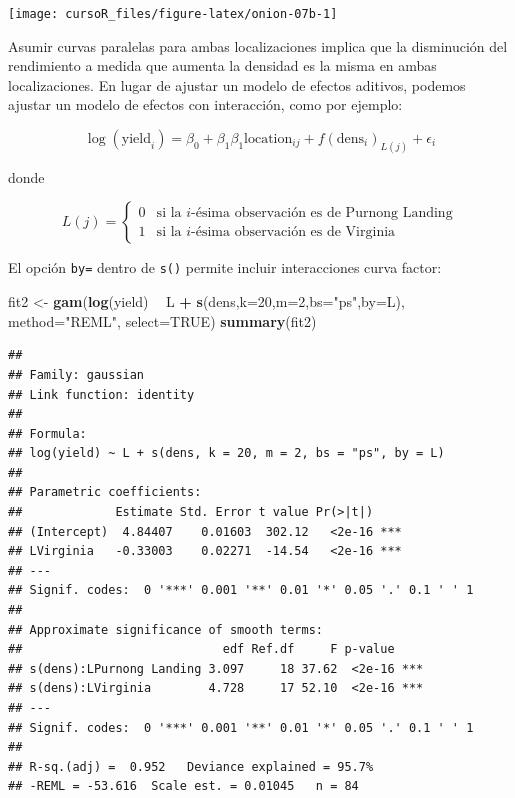 \documentclass[]{book}
\newenvironment{Shaded}{\begin{snugshade}}{\end{snugshade}}
\newcommand{\KeywordTok}[1]{\textcolor[rgb]{0.13,0.29,0.53}{\textbf{#1}}}
\newcommand{\DataTypeTok}[1]{\textcolor[rgb]{0.13,0.29,0.53}{#1}}
\newcommand{\DecValTok}[1]{\textcolor[rgb]{0.00,0.00,0.81}{#1}}
\newcommand{\StringTok}[1]{\textcolor[rgb]{0.31,0.60,0.02}{#1}}
\newcommand{\OtherTok}[1]{\textcolor[rgb]{0.56,0.35,0.01}{#1}}
\newcommand{\OperatorTok}[1]{\textcolor[rgb]{0.81,0.36,0.00}{\textbf{#1}}}
\newcommand{\NormalTok}[1]{#1}
\begin{document}
\begin{center}\texttt{[image: cursoR\_files/figure-latex/onion-07b-1]} \end{center}

Asumir curvas paralelas para ambas localizaciones implica que la
disminución del rendimiento a medida que aumenta la densidad es la misma
en ambas localizaciones. En lugar de ajustar un modelo de efectos
aditivos, podemos ajustar un modelo de efectos con interacción, como por
ejemplo:

\[
\log(\text{yield}_i) =\beta_0 + \beta_1 \beta_1\text{location}_{ij} +  f(\text{dens}_i)_{L(j)} + \epsilon_i
\]

donde

\[
L(j) =
\left\{
\begin{array}{cl}
0 & \mbox{si la $i$-ésima observación es de Purnong Landing} \\
1 & \mbox{si la $i$-ésima observación es de Virginia}
\end{array}
\right.
\]

El opción \texttt{by=} dentro de \texttt{s()} permite incluir
interacciones curva factor:

\begin{Shaded}
\begin{Highlighting}[]
\NormalTok{fit2 <-}\StringTok{ }\KeywordTok{gam}\NormalTok{(}\KeywordTok{log}\NormalTok{(yield) }\OperatorTok{~}\StringTok{ }\NormalTok{L }\OperatorTok{+}\StringTok{ }\KeywordTok{s}\NormalTok{(dens,}\DataTypeTok{k=}\DecValTok{20}\NormalTok{,}\DataTypeTok{m=}\DecValTok{2}\NormalTok{,}\DataTypeTok{bs=}\StringTok{"ps"}\NormalTok{,}\DataTypeTok{by=}\NormalTok{L),}
            \DataTypeTok{method=}\StringTok{"REML"}\NormalTok{, }\DataTypeTok{select=}\OtherTok{TRUE}\NormalTok{)}
\KeywordTok{summary}\NormalTok{(fit2)}
\end{Highlighting}
\end{Shaded}

\begin{verbatim}
## 
## Family: gaussian 
## Link function: identity 
## 
## Formula:
## log(yield) ~ L + s(dens, k = 20, m = 2, bs = "ps", by = L)
## 
## Parametric coefficients:
##             Estimate Std. Error t value Pr(>|t|)    
## (Intercept)  4.84407    0.01603  302.12   <2e-16 ***
## LVirginia   -0.33003    0.02271  -14.54   <2e-16 ***
## ---
## Signif. codes:  0 '***' 0.001 '**' 0.01 '*' 0.05 '.' 0.1 ' ' 1
## 
## Approximate significance of smooth terms:
##                            edf Ref.df     F p-value    
## s(dens):LPurnong Landing 3.097     18 37.62  <2e-16 ***
## s(dens):LVirginia        4.728     17 52.10  <2e-16 ***
## ---
## Signif. codes:  0 '***' 0.001 '**' 0.01 '*' 0.05 '.' 0.1 ' ' 1
## 
## R-sq.(adj) =  0.952   Deviance explained = 95.7%
## -REML = -53.616  Scale est. = 0.01045   n = 84
\end{verbatim}
\end{document}
